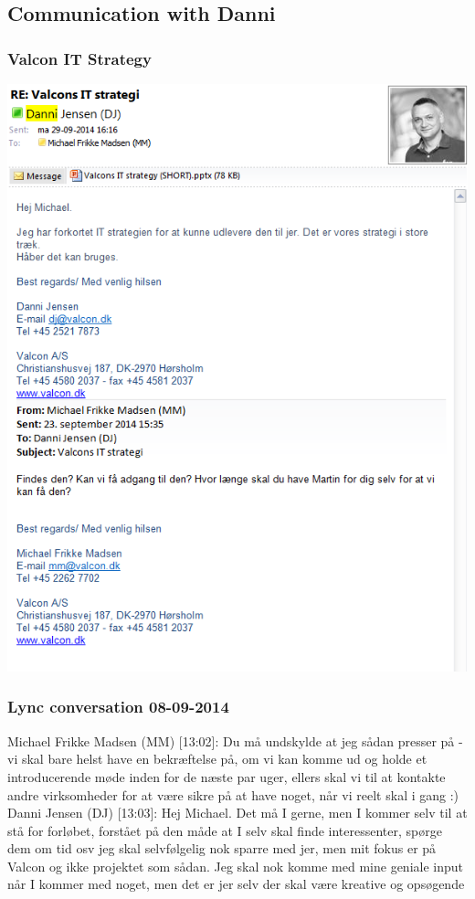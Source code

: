 \subsection{Communication with Danni}
\label{app:email}

\subsubsection{Valcon IT Strategy}
\includegraphics[width=1.36\textwidth]{appendix/danni_communication_1}

\subsubsection{Lync conversation 08-09-2014}
Michael Frikke Madsen (MM) [13:02]: 
Du må undskylde at jeg sådan presser på - vi skal bare helst have en bekræftelse på, om vi kan komme ud og holde et introducerende møde inden for de næste par uger, ellers skal vi til at kontakte andre virksomheder for at være sikre på at have noget, når vi reelt skal i gang :) \newline
Danni Jensen (DJ) [13:03]: 
Hej Michael. Det må I gerne, men I kommer selv til at stå for forløbet, forstået på den måde at I selv skal finde interessenter, spørge dem om tid osv
jeg skal selvfølgelig nok sparre med jer, men mit fokus er på Valcon og ikke projektet som sådan. Jeg skal nok komme med mine geniale input når I kommer med noget, men det er jer selv der skal være kreative og opsøgende

